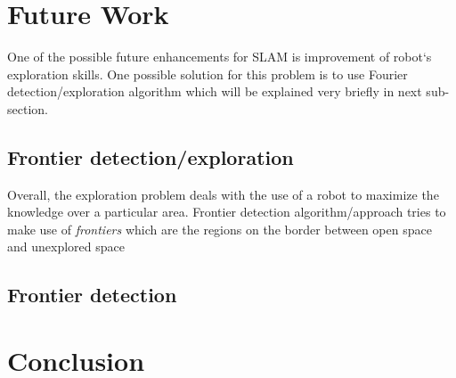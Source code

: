 \documentclass{ba-kecs}
\numberwithin{figure}{section}
\numberwithin{equation}{section}
\begin{document}

\section{Future Work}

	One of the possible future enhancements for SLAM is improvement of robot`s exploration skills. One possible solution for this problem is to use Fourier detection/exploration algorithm which will be explained very briefly in next sub-section.
\subsection{Frontier detection/exploration}
	Overall, the exploration problem deals with the use of a robot to maximize the knowledge over a particular area. Frontier detection algorithm/approach tries to make use of \textit{frontiers} which are the regions on the border between open space and unexplored space \cite{frontier}

\subsection{Frontier detection}


\section{Conclusion}



\end{document}
